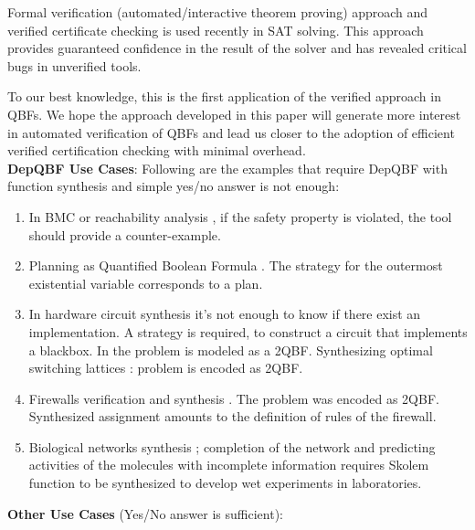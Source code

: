 \documentclass[runningheads]{llncs}
\newcommand{\0}{0}
\newcommand{\1}{1}
\begin{document}
Formal verification (automated/interactive theorem proving) approach \cite{Fleury2018a, Fleury2019a, BlanchetteFLW18} and verified certificate checking \cite{Cruz2017, Cruz2017b, Heule2017a, Lammich17} is used recently in SAT solving. This approach provides guaranteed confidence in the result of the solver and has revealed critical bugs \cite{Lammich17} in unverified tools. 

To our best knowledge, this is the first application of the verified approach in QBFs. We hope the approach developed in this paper will generate more interest in automated verification of QBFs and lead us closer to the adoption of efficient verified certification checking with minimal overhead. \\
 
 
\textbf{DepQBF Use Cases}: 
Following are the examples that require DepQBF with function synthesis and simple yes/no answer is not enough:
 
\begin{enumerate}
 	\item In BMC or reachability analysis \cite{BloemKS14}, if the safety property is violated, the tool should provide a counter-example. 
 	
 	\item Planning as Quantified Boolean Formula \cite{Cashmore2012planning, EglyKLP17, Gasquet18}. The strategy for the outermost existential variable corresponds to a plan. 
 	\item In hardware circuit synthesis \cite{BloemEKKL14, BloemKS14, Faymonville2017, Subramanyan2013, Li2013} it's not enough to know if there exist an implementation. A strategy is required, to construct a circuit that implements a blackbox. In \cite{Subramanyan2013, Li2013} the problem is modeled as a 2QBF. Synthesizing optimal switching lattices \cite{Gange2014synthesizing}: problem is encoded as 2QBF. 
 	\item Firewalls verification and synthesis \cite{Zhang2012verification}. The problem was encoded as 2QBF. Synthesized assignment amounts to the definition of rules of the firewall.
 	\item Biological networks synthesis \cite{GuptaMS18}; completion of the network and predicting activities of the molecules with incomplete information requires Skolem function to be synthesized to develop wet experiments in laboratories.  
\end{enumerate}

\textbf{Other Use Cases} (Yes/No answer is sufficient):
\end{document}
